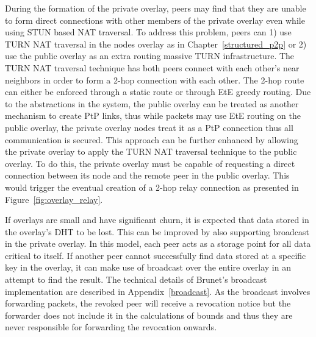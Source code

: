 During the formation of the private overlay, peers may find that they are
unable to form direct connections with other members of the private overlay
even while using STUN based NAT traversal.   To address this problem, peers can
1) use TURN NAT traversal in the nodes overlay as in Chapter~\ref{structured_p2p}
or 2) use the public overlay as an extra routing massive TURN infrastructure.
The TURN NAT traversal technique has both peers connect with each other's near
neighbors in order to form a 2-hop connection with each other.  The 2-hop route
can either be enforced through a static route or through EtE greedy routing.
Due to the abstractions in the system, the public overlay can be treated as
another mechanism to create PtP links, thus while packets may use EtE routing
on the public overlay, the private overlay nodes treat it as a PtP connection
thus all communication is secured.  This approach can be further enhanced by
allowing the private overlay to apply the TURN NAT traversal technique to the
public overlay.  To do this, the private overlay must be capable of requesting
a direct connection between its node and the remote peer in the public overlay.
This would trigger the eventual creation of a 2-hop relay connection as
presented in Figure~\ref{fig:overlay_relay}.


If overlays are small and have significant churn, it is expected that data stored
in the overlay's DHT to be lost.  This can be improved by also supporting
broadcast in the private overlay.  In this model, each peer acts as a storage
point for all data critical to itself.  If another peer cannot successfully
find data stored at a specific key in the overlay, it can make use of broadcast
over the entire overlay in an attempt to find the result.  The technical details
of Brunet's broadcast implementation are described in Appendix~\ref{broadcast}.
As the broadcast involves forwarding packets, the revoked peer will receive
a revocation notice but the forwarder does not include it in the calculations
of bounds and thus they are never responsible for forwarding the revocation
onwards.

